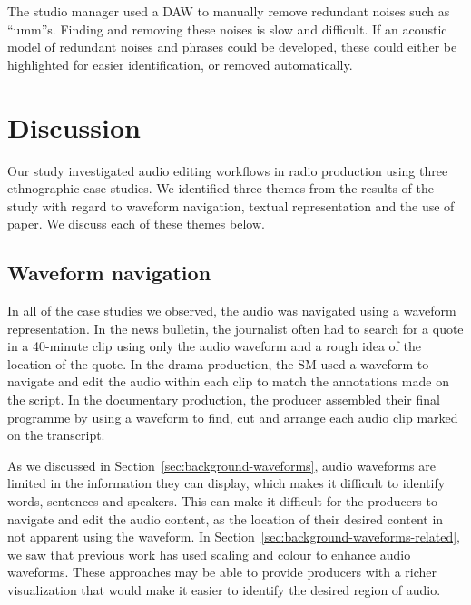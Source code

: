 The studio manager used a DAW to manually remove redundant noises such as ``umm''s.  Finding and removing these noises
is slow and difficult. If an acoustic model of redundant noises and phrases could be developed, these could either be
highlighted for easier identification, or removed automatically.

\section{Discussion}\label{sec:ethno-discussion}
Our study investigated audio editing workflows in radio production using three ethnographic case studies. We identified
three themes from the results of the study with regard to waveform navigation, textual representation and the use of
paper. We discuss each of these themes below.

\subsection{Waveform navigation}
In all of the case studies we observed, the audio was navigated using a waveform representation.  In the news bulletin,
the journalist often had to search for a quote in a 40-minute clip using only the audio waveform and a rough idea of
the location of the quote.  In the drama production, the SM used a waveform to navigate and edit the audio within each
clip to match the annotations made on the script.  In the documentary production, the producer assembled their final
programme by using a waveform to find, cut and arrange each audio clip marked on the transcript.

As we discussed in Section~\ref{sec:background-waveforms}, audio waveforms are limited in the information they can
display, which makes it difficult to identify words, sentences and speakers.  This can make it difficult for the
producers to navigate and edit the audio content, as the location of their desired content in not apparent using the
waveform. In Section~\ref{sec:background-waveforms-related}, we saw that previous work has used scaling and colour to
enhance audio waveforms. These approaches may be able to provide producers with a richer visualization that would make
it easier to identify the desired region of audio.



